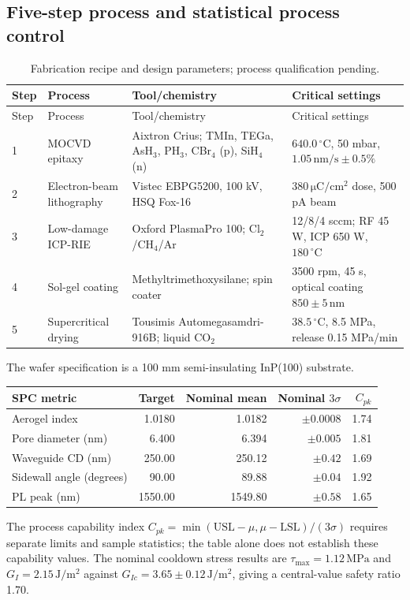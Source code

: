 \documentclass[11pt,a4paper]{article}
\newcommand{\unit}[1]{\,\mathrm{#1}}
\begin{document}
\subsection{Five-step process and statistical process control}
\begin{longtable}{@{}P{0.85cm}P{3.4cm}P{4.85cm}P{6.0cm}@{}}
\caption{Fabrication recipe and design parameters; process qualification pending.}\\
\toprule Step & Process & Tool/chemistry & Critical settings\\\midrule\endfirsthead
\toprule Step & Process & Tool/chemistry & Critical settings\\\midrule{} & MOCVD epitaxy & Aixtron Crius; TMIn, TEGa, AsH$_3$, PH$_3$, CBr$_4$ (p), SiH$_4$ (n)
& $640.0\,^{\circ}\mathrm C$, 50 mbar, $1.05\unit{nm/s}\pm0.5\%$\\
2 & Electron-beam lithography & Vistec EBPG5200, 100 kV, HSQ Fox-16 &
$380\unit{\mu C/cm^2}$ dose, 500 pA beam\\
3 & Low-damage ICP-RIE & Oxford PlasmaPro 100; Cl$_2$/CH$_4$/Ar &
12/8/4 sccm; RF 45 W, ICP 650 W, $180\,^{\circ}\mathrm C$\\
4 & Sol-gel coating & Methyltrimethoxysilane; spin coater &
3500 rpm, 45 s, optical coating $850\pm5\unit{nm}$\\
5 & Supercritical drying & Tousimis Automegasamdri-916B; liquid CO$_2$ &
$38.5\,^{\circ}\mathrm C$, 8.5 MPa, release 0.15 MPa/min\\\bottomrule
\end{longtable}
The wafer specification is a 100 mm semi-insulating InP(100) substrate.
\begin{center}\small
\begin{tabular}{@{}lrrrr@{}}\toprule
SPC metric & Target & Nominal mean & Nominal $3\sigma$ & $C_{pk}$\\\midrule
Aerogel index & 1.0180 & 1.0182 & $\pm0.0008$ & 1.74\\
Pore diameter (nm) & 6.400 & 6.394 & $\pm0.005$ & 1.81\\
Waveguide CD (nm) & 250.00 & 250.12 & $\pm0.42$ & 1.69\\
Sidewall angle (degrees) & 90.00 & 89.88 & $\pm0.04$ & 1.92\\
PL peak (nm) & 1550.00 & 1549.80 & $\pm0.58$ & 1.65\\\bottomrule
\end{tabular}\end{center}
The process capability index $C_{pk}=\min(\mathrm{USL}-\mu,
\mu-\mathrm{LSL})/(3\sigma)$ requires separate limits and sample statistics; the table alone
does not establish these capability values. The nominal cooldown stress results are
$\tau_{\max}=1.12\unit{MPa}$ and $G_I=2.15\unit{J/m^2}$ against
$G_{Ic}=3.65\pm0.12\unit{J/m^2}$, giving a central-value safety ratio 1.70.
\end{document}
